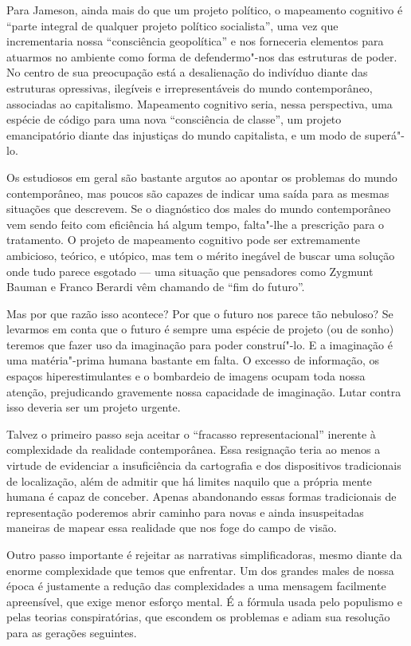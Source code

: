 Para Jameson, ainda mais do que um projeto político, o mapeamento
cognitivo é ``parte integral de qualquer projeto político socialista'',
uma vez que incrementaria nossa ``consciência geopolítica'' e nos
forneceria elementos para atuarmos no ambiente como forma de
defendermo"-nos das estruturas de poder. No centro de sua preocupação
está a desalienação do indivíduo diante das estruturas opressivas,
ilegíveis e irrepresentáveis do mundo contemporâneo, associadas ao
capitalismo. Mapeamento cognitivo seria, nessa perspectiva, uma espécie
de código para uma nova ``consciência de classe'', um projeto
emancipatório diante das injustiças do mundo capitalista, e um modo de
superá"-lo.

Os estudiosos em geral são bastante argutos ao apontar os problemas do
mundo contemporâneo, mas poucos são capazes de indicar uma saída para as
mesmas situações que descrevem. Se o diagnóstico dos males do mundo
contemporâneo vem sendo feito com eficiência há algum tempo, falta"-lhe a
prescrição para o tratamento. O projeto de mapeamento cognitivo pode ser
extremamente ambicioso, teórico, e utópico, mas tem o mérito inegável de
buscar uma solução onde tudo parece esgotado --- uma situação que
pensadores como Zygmunt Bauman e Franco Berardi vêm chamando de ``fim do
futuro''.

Mas por que razão isso acontece? Por que o futuro nos parece tão
nebuloso? Se levarmos em conta que o futuro é sempre uma espécie de
projeto (ou de sonho) teremos que fazer uso da imaginação para poder
construí"-lo. E a imaginação é uma matéria"-prima humana bastante em
falta. O excesso de informação, os espaços hiperestimulantes e o
bombardeio de imagens ocupam toda nossa atenção, prejudicando gravemente
nossa capacidade de imaginação. Lutar contra isso deveria ser um projeto
urgente.

Talvez o primeiro passo seja aceitar o ``fracasso representacional''
inerente à complexidade da realidade contemporânea. Essa resignação
teria ao menos a virtude de evidenciar a insuficiência da cartografia e
dos dispositivos tradicionais de localização, além de admitir que há limites naquilo que a própria mente humana é capaz de conceber. Apenas abandonando essas formas tradicionais de
representação poderemos abrir caminho para novas e ainda insuspeitadas
maneiras de mapear essa realidade que nos foge do campo de visão.

Outro passo importante é rejeitar as narrativas simplificadoras, mesmo diante da enorme complexidade que temos que enfrentar. Um dos grandes males de nossa época é justamente a redução das complexidades a uma mensagem facilmente apreensível, que exige menor esforço mental. É a fórmula usada pelo populismo e pelas teorias conspiratórias, que escondem os problemas e adiam sua resolução para as gerações seguintes. 

